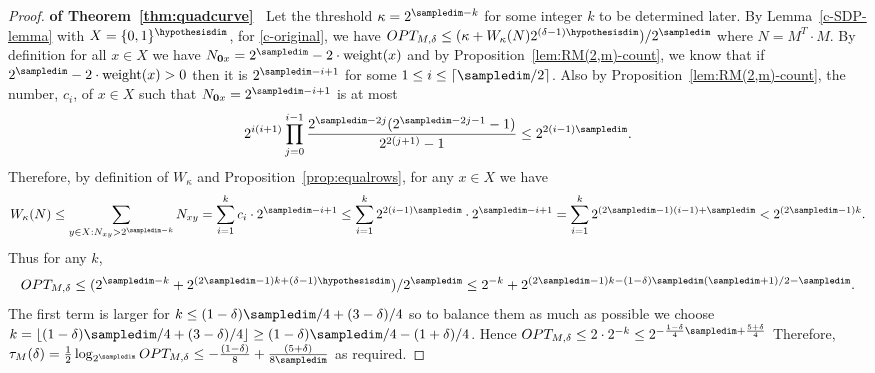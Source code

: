 
\begin{proof}{\bfseries\upshape of Theorem~\ref{thm:quadcurve}\ }
Let the threshold $\kappa=2^{\sampledim-k}$ for some integer $k$ to be determined later.
By Lemma~\ref{c-SDP-lemma} with $X=\{0,1\}^\hypothesisdim$, for \eqref{c-original}, we have
$OPT_{M,\delta}\le (\kappa+W_\kappa(N) 2^{(\delta-1)\hypothesisdim})/2^\sampledim$ where
$N=M^T\cdot M$.
By definition for all $x\in X$ we have $N_{\mathbf{0}x}=2^\sampledim-2\cdot \w(x)$
and by Proposition~\ref{lem:RM(2,m)-count}, we know that if $2^\sampledim-2\cdot \w(x)>0$
then it is $2^{\sampledim-i+1}$ for some $1\le i\le \lceil \sampledim/2\rceil$.
Also by Proposition~\ref{lem:RM(2,m)-count}, the number, $c_i$, of $x\in X$
such that $N_{\mathbf{0}x}=2^{\sampledim-i+1}$ is at most
$$2^{i(i+1)} \prod_{j=0}^{i-1} \frac{2^{\sampledim-2j}(2^{\sampledim-2j-1}-1)}{2^{2(j+1)}-1}
\le 2^{2(i-1)\sampledim}.$$
Therefore, by definition
of $W_\kappa$ and Proposition~\ref{prop:equalrows}, for any $x\in X$ 
we have 
\begin{equation*}
W_\kappa(N)
\le \sum_{y\in X: N_{xy}> 2^{\sampledim-k}} N_{xy}
=\sum_{i=1}^{k}  c_i\cdot 2^{\sampledim-i+1} 
\le \sum_{i=1}^{k} 2^{2(i-1)\sampledim}\cdot 2^{\sampledim-i+1}
=\sum_{i=1}^{k} 2^{(2\sampledim-1)(i-1)+\sampledim}
< 2^{(2\sampledim-1)k}.
\end{equation*}
Thus for any $k$,
$$OPT_{M,\delta}\le (2^{\sampledim-k}+2^{(2\sampledim-1)k+(\delta-1)\hypothesisdim})/2^\sampledim\le 2^{-k}+2^{(2\sampledim-1)k-(1-\delta)\sampledim(\sampledim+1)/2-\sampledim}.$$
The first term is larger for $k\le (1-\delta) \sampledim/4 + (3-\delta)/4$ so to balance
them as much as possible we choose
$k=\lfloor (1-\delta) \sampledim/4 + (3-\delta)/4\rfloor\ge (1-\delta)\sampledim/4 -(1+\delta)/4$.
Hence $OPT_{M,\delta}\le 2\cdot 2^{-k} \le 2^{-\frac {1-\delta}4 \sampledim +\frac{5+\delta}4}$
Therefore,
$\tau_M(\delta)=\frac12 \log_{2^\sampledim} OPT_{M,\delta}\le -\frac{(1-\delta)}8+\frac{(5+\delta)}{8\sampledim}$ as required. 
\end{proof}


